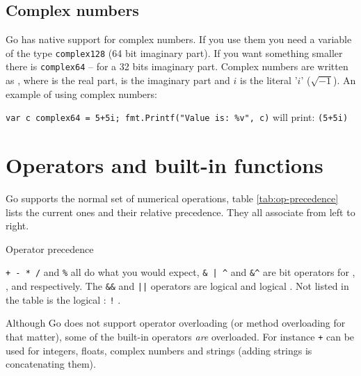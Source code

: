 \subsection{Complex numbers}
Go has native support for complex numbers. If you 
use them you need a variable of the type \lstinline{complex128} (64
bit imaginary part). If you
want something smaller there is \lstinline{complex64} -- for a 32 bits
imaginary part.
Complex numbers are written as
, where  is the real part,
 is the imaginary part and $i$ is the literal '$i$' ($\sqrt{-1}$).
An example of using complex numbers:

\lstinline{var c complex64 = 5+5i; fmt.Printf("Value is: %v", c)}\newline
will print: \lstinline{(5+5i)}

\section{Operators and built-in functions}
Go supports the normal set of numerical operations,
table \ref{tab:op-precedence}
lists the current ones and their relative precedence. They
all associate from left to right.

\begin{table}[H]
\begin{center}
\caption{Operator precedence}
\label{tab:op-precedence}

\end{center}
\end{table}
\verb|+ - * /| and \verb|%| all do what you would expect,
\verb!& | ^!
and \verb!&^! are bit operators for
, 
,  and  respectively.
The \verb|&&| and \verb/||/ operators are 
logical  and
logical . Not listed in the table
is the logical : \verb/!/ .

Although Go does not support operator overloading (or method
overloading for that matter), some of the built-in
operators \emph{are} overloaded. For instance \texttt{+} can be used for integers,
floats, complex numbers and strings (adding strings is concatenating
them). 


